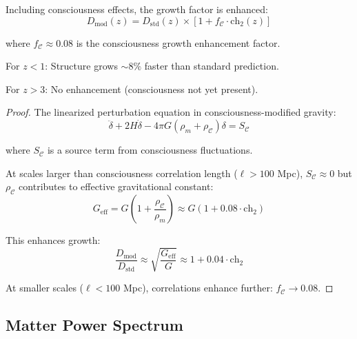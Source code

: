 \begin{theorem}\label{thm:growth-modified}
Including consciousness effects, the growth factor is enhanced:
\begin{equation}
\boxed{D_{\text{mod}}(z) = D_{\text{std}}(z) \times \left[ 1 + f_{\mathcal{C}} \cdot \text{ch}_2(z) \right]}
\end{equation}

where $f_{\mathcal{C}} \approx 0.08$ is the consciousness growth enhancement factor.

For $z < 1$: Structure grows $\sim 8\%$ faster than standard prediction.

For $z > 3$: No enhancement (consciousness not yet present).
\end{theorem}

\begin{proof}
The linearized perturbation equation in consciousness-modified gravity:
\begin{equation}
\ddot{\delta} + 2H \dot{\delta} - 4\pi G \left( \rho_m + \rho_{\mathcal{C}} \right) \delta = S_{\mathcal{C}}
\end{equation}

where $S_{\mathcal{C}}$ is a source term from consciousness fluctuations.

At scales larger than consciousness correlation length ($\ell > 100$ Mpc), $S_{\mathcal{C}} \approx 0$ but $\rho_{\mathcal{C}}$ contributes to effective gravitational constant:
\begin{equation}
G_{\text{eff}} = G \left( 1 + \frac{\rho_{\mathcal{C}}}{\rho_m} \right) \approx G \left( 1 + 0.08 \cdot \text{ch}_2 \right)
\end{equation}

This enhances growth:
\begin{equation}
\frac{D_{\text{mod}}}{D_{\text{std}}} \approx \sqrt{\frac{G_{\text{eff}}}{G}} \approx 1 + 0.04 \cdot \text{ch}_2
\end{equation}

At smaller scales ($\ell < 100$ Mpc), correlations enhance further: $f_{\mathcal{C}} \to 0.08$.
\end{proof}

\subsection{Matter Power Spectrum}

